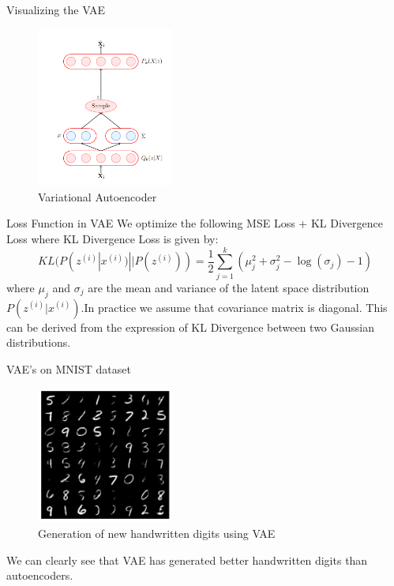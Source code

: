 \begin{frame}{Visualizing the VAE}
    \begin{figure}
        \centering
        \includegraphics[width=0.4\textwidth]{vae.png}
        \caption{Variational Autoencoder}
    \end{figure}
\end{frame}

\begin{frame}{Loss Function in VAE}
    We optimize the following MSE Loss + KL Divergence Loss where KL Divergence Loss is given by:
    \begin{equation}
        \boxed{KL(P(z^{(i)}|x^{(i)}) || P(z^{(i)})) = \frac{1}{2} \sum_{j=1}^{k} (\mu_j^2 + \sigma_j^2 - \log(\sigma_j) - 1)}
    \end{equation}
    where $\mu_j$ and $\sigma_j$ are the mean and variance of the latent space distribution $P(z^{(i)}|x^{(i)})$.In practice we assume that covariance matrix is diagonal.
    \pause 
    This can be derived from the expression of KL Divergence between two Gaussian distributions.
\end{frame}

\begin{frame}{VAE's on MNIST dataset}
    \begin{figure}
        \centering
        \includegraphics[width=0.4\textwidth]{../ReportNeurips/mnistGenerated1.png}
        \caption{Generation of new handwritten digits using VAE}
    \end{figure}
    We can clearly see that VAE has generated better handwritten digits than autoencoders.
\end{frame}


